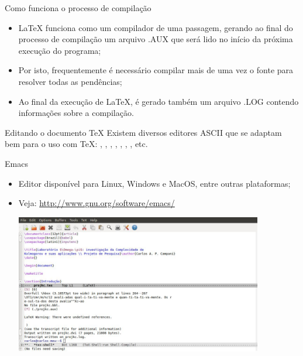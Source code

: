 \begin{frame}{Como funciona o processo de compilação}
\begin{itemize}
\item  \LaTeX{} funciona como um compilador de uma passagem, gerando ao final do processo de compilação um arquivo .AUX que será lido no início da próxima execução do programa;
\item Por isto, frequentemente é necessário compilar mais de uma vez o fonte para resolver todas as pendências;
\item Ao final da execução de \LaTeX, é gerado também um arquivo .LOG contendo informações sobre a compilação.
\end{itemize}
\end{frame}

\begin{frame}{Editando o documento \TeX}
Existem diversos editores ASCII que se adaptam bem para o uso com \TeX: , , , , , , , etc.
\end{frame}

\begin{frame}{Emacs}
\begin{itemize}
\item Editor disponível para Linux, Windows e MacOS, entre outras plataformas;
\item Veja: \url{http://www.gnu.org/software/emacs/}

\vspace{0.3cm}

\centering\includegraphics[width=0.85\textwidth]{img/emacs.pdf}
\end{itemize}
\end{frame}

